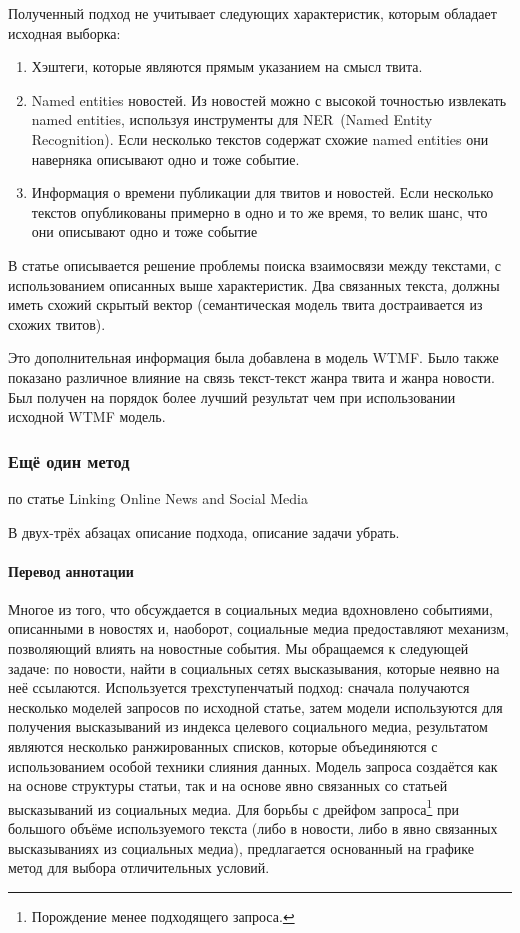             Полученный подход не учитывает следующих характеристик, которым обладает исходная выборка:
            \begin{enumerate}
                \item Хэштеги, которые являются прямым указанием на смысл твита.
                \item {\color{red} Named entities} новостей. Из новостей можно с высокой точностью извлекать {\color{red} named entities}, используя инструменты для NER~(Named Entity Recognition). Если несколько текстов содержат схожие {\color{red} named entities} они наверняка описывают одно и тоже событие.
                \item Информация о времени публикации для твитов и новостей. Если несколько текстов опубликованы примерно в одно и то же время, то велик шанс, что они описывают одно и тоже событие
            \end{enumerate}
            В статье описывается решение проблемы поиска взаимосвязи между текстами, с использованием описанных выше характеристик. Два связанных текста, должны иметь схожий скрытый вектор (семантическая модель твита достраивается из схожих твитов).

            Это дополнительная информация была добавлена в модель WTMF. Было также показано различное влияние на связь текст-текст жанра твита и жанра новости. Был получен на порядок более лучший результат чем при использовании исходной WTMF модель.

    \subsubsection{Ещё один метод}
        по статье Linking Online News and Social Media

        В двух-трёх абзацах описание подхода, описание задачи убрать.

        \paragraph{Перевод аннотации}
            Многое из того, что обсуждается в социальных медиа вдохновлено событиями, описанными в новостях и, наоборот, социальные медиа предоставляют механизм, позволяющий влиять на новостные события.
            Мы обращаемся к следующей задаче: по новости, найти в социальных сетях высказывания, которые неявно на неё ссылаются.
            Используется трехступенчатый подход: сначала получаются несколько моделей запросов по исходной статье, затем модели используются для получения высказываний из индекса целевого социального медиа, результатом являются несколько ранжированных списков, которые объединяются с использованием особой техники слияния данных.
            Модель запроса создаётся как на основе структуры статьи, так и на основе явно связанных со статьей высказываний из социальных медиа.
            Для борьбы с дрейфом запроса\footnote{Порождение менее подходящего запроса.} при большого объёме используемого текста (либо в новости, либо в явно связанных высказываниях из социальных медиа), предлагается основанный на графике метод для выбора отличительных условий.

